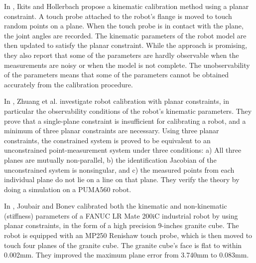 In \cite{Ikits1997}, Ikits and Hollerbach propose a kinematic calibration method using a planar constraint. A touch probe attached to the robot's flange is moved to touch random points on a plane. When the touch probe is in contact with the plane, the joint angles are recorded. The kinematic parameters of the robot model are then updated to satisfy the planar constraint. While the approach is promising, they also report that some of the parameters are hardly observable when the measurements are noisy or when the model is not complete. The unobservability of the parameters means that some of the parameters cannot be obtained accurately from the calibration procedure.

In \cite{Zhuang1999}, Zhuang et al. investigate robot calibration with planar constraints, in particular the observability conditions of the robot's kinematic parameters. They prove that a single-plane constraint is insufficient for calibrating a robot, and a minimum of three planar constraints are necessary. Using three planar constraints, the constrained system is proved to be equivalent to an unconstrained point-measurement system under three conditions: a) All three planes are mutually non-parallel, b) the identification Jacobian of the unconstrained system is nonsingular, and c) the measured points from each individual plane do not lie on a line on that plane. They verify the theory by doing a simulation on a PUMA560 robot. 

In \cite{Joubair2015}, Joubair and Bonev calibrated both the kinematic and non-kinematic (stiffness) parameters of a FANUC LR Mate 200iC industrial robot by using planar constraints, in the form of a high precision 9-inches granite cube. The robot is equipped with an MP250 Renishaw touch probe, which is then moved to touch four planes of the granite cube. The granite cube's face is flat to within 0.002mm. They improved the maximum plane error from 3.740mm to 0.083mm. 

